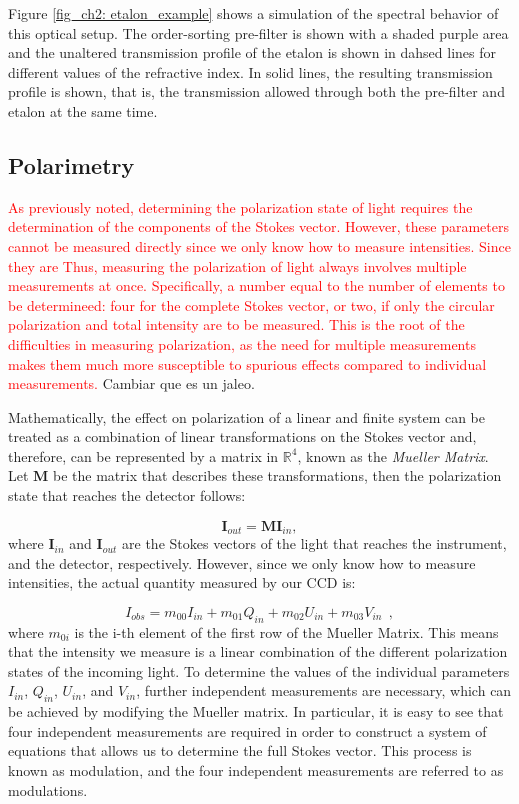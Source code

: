 Figure \ref{fig_ch2: etalon_example} shows a simulation of the spectral behavior of this optical setup. The order-sorting pre-filter is shown with a shaded purple area and the unaltered transmission profile of the etalon is shown in dahsed lines for different values of the refractive index. In solid lines, the resulting transmission profile is shown, that is, the transmission allowed through both the pre-filter and etalon at the same time. 

\subsection{Polarimetry}

\textcolor{red}{As previously noted, determining the polarization state of light requires the determination of the components of the Stokes vector. However, these parameters cannot be measured directly since we only know how to measure intensities. Since they are  Thus, measuring the polarization of light always involves multiple measurements at once. Specifically, a number equal to the number of elements to be determineed: four for the complete Stokes vector, or two, if only the circular polarization and total intensity are to be measured. This is the root of the difficulties in measuring polarization, as the need for multiple measurements makes them much more susceptible to spurious effects compared to individual measurements.} Cambiar que es un jaleo. 

Mathematically, the effect on polarization of a linear and finite system can be treated as a combination of linear transformations on the Stokes vector and, therefore, can be represented by a matrix in $\mathbb{R}^4$, known as the \textit{Mueller Matrix}. Let $\textbf{M}$ be the matrix that describes these transformations, then the polarization state that reaches the detector follows:

\begin{equation}
  \textbf{I}_{out} = \textbf{M}\textbf{I}_{in},
\end{equation}
where $\textbf{I}_{in}$ and $\textbf{I}_{out}$ are the Stokes vectors of the light that reaches the instrument, and the detector, respectively. However, since we only know how to measure intensities, the actual quantity measured by our CCD is: 

\begin{equation}
  I_{obs} = m_{00}I_{in} + m_{01}Q_{in} + m_{02}U_{in} + m_{03}V_{in} \ \ ,
\end{equation}
where $m_{0i}$ is the i-th element of the first row of the Mueller Matrix. This means that the intensity we measure is a linear combination of the different polarization states of the incoming light. To determine the values of the individual parameters $I_{in}$, $Q_{in}$, $U_{in}$, and $V_{in}$, further independent measurements are necessary, which can be achieved by modifying the Mueller matrix. In particular, it is easy to see that four independent measurements are required in order to construct a system of equations that allows us to determine the full Stokes vector. This process is known as modulation, and the four independent measurements are referred to as modulations.

